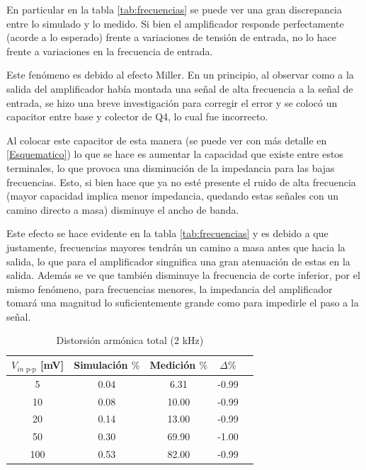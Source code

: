 En particular en la tabla \ref{tab:frecuencias} se puede ver una gran discrepancia entre lo simulado y lo medido. Si bien el amplificador responde perfectamente (acorde a lo esperado) frente a variaciones de tensión de entrada, no lo hace frente a variaciones en la frecuencia de entrada.

Este fenómeno es debido al efecto Miller. En un principio, al observar como a la salida del amplificador había montada una señal de alta frecuencia a la señal de entrada, se hizo una breve investigación para corregir el error y se colocó un capacitor entre base y colector de Q4, lo cual fue incorrecto.

Al colocar este capacitor de esta manera (se puede ver con más detalle en \cref{Esquematico}) lo que se hace es aumentar la capacidad que existe entre estos terminales, lo que provoca una disminución de la impedancia para las bajas frecuencias. Esto, si bien hace que ya no esté presente el ruido de alta frecuencia (mayor capacidad implica menor impedancia, quedando estas señales con un camino directo a masa) disminuye el ancho de banda.

Este efecto se hace evidente en la tabla \ref{tab:frecuencias} y es debido a que justamente, frecuencias mayores tendrán un camino a masa antes que hacia la salida, lo que para el amplificador singnifica una gran atenuación de estas en la salida. Además se ve que también disminuye la frecuencia de corte inferior, por el mismo fenómeno, para frecuencias menores, la impedancia del amplificador tomará una magnitud lo suficientemente grande como para impedirle el paso a la señal.

\begin{table}[H]
\centering
\begin{tabular}{|c|c|c|c|c|}
\hline
\textbf{$V_{in\text{ p-p}}$ [mV]}& \textbf{Simulación} $\%$& \textbf{Medición} $\%$& $\Delta \%$ \\ \hline
5 & 0.04 & 6.31 & -0.99 \\ \hline
10  & 0.08 & 10.00 & -0.99 \\ \hline
20  & 0.14 & 13.00 & -0.99 \\ \hline
50  & 0.30 & 69.90 & -1.00 \\ \hline
100  & 0.53 & 82.00 & -0.99 \\ \hline
\end{tabular}
\caption{Distorsión armónica total (2 kHz)}
\label{tab:thd_2khz}
\end{table}

